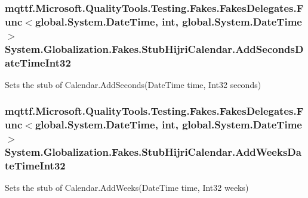 \hypertarget{class_system_1_1_globalization_1_1_fakes_1_1_stub_hijri_calendar_a0df2707580f83d4060da4efdea8f5db5}{
\subsubsection[{Add\-Seconds\-Date\-Time\-Int32}]{\setlength{\rightskip}{0pt plus 5cm}mqttf.\-Microsoft.\-Quality\-Tools.\-Testing.\-Fakes.\-Fakes\-Delegates.\-Func$<$global.\-System.\-Date\-Time, int, global.\-System.\-Date\-Time$>$ System.\-Globalization.\-Fakes.\-Stub\-Hijri\-Calendar.\-Add\-Seconds\-Date\-Time\-Int32}}\label{class_system_1_1_globalization_1_1_fakes_1_1_stub_hijri_calendar_a0df2707580f83d4060da4efdea8f5db5}


Sets the stub of Calendar.\-Add\-Seconds(\-Date\-Time time, Int32 seconds)

\hypertarget{class_system_1_1_globalization_1_1_fakes_1_1_stub_hijri_calendar_a05305991503e1a8d9bf360e3bdecb7bd}{
\subsubsection[{Add\-Weeks\-Date\-Time\-Int32}]{\setlength{\rightskip}{0pt plus 5cm}mqttf.\-Microsoft.\-Quality\-Tools.\-Testing.\-Fakes.\-Fakes\-Delegates.\-Func$<$global.\-System.\-Date\-Time, int, global.\-System.\-Date\-Time$>$ System.\-Globalization.\-Fakes.\-Stub\-Hijri\-Calendar.\-Add\-Weeks\-Date\-Time\-Int32}}\label{class_system_1_1_globalization_1_1_fakes_1_1_stub_hijri_calendar_a05305991503e1a8d9bf360e3bdecb7bd}


Sets the stub of Calendar.\-Add\-Weeks(\-Date\-Time time, Int32 weeks)

